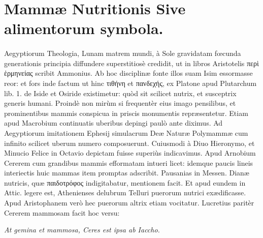 \documentclass[a4paper, 11pt, oneside, polutonikogreek, latin]{article}
\begin{document}
\section{Mammæ Nutritionis Sive alimentorum symbola.}
\paragraph{}
Aegyptiorum Theologia, Lunam matrem mundi, à Sole gravidatam fœcunda generationis principia diffundere superstitiosè credidit, ut in libros Aristotelis περὶ ἑρμηνείας scribit Ammonius. Ab hoc disciplinæ fonte illos suam Isim essormasse reor: et fors inde factum ut hinc 	τιθήνη et πανδεχής, ex Platone apud Plutarchum lib. 1. de Iside et Osiride existimetur: quòd sit scilicet nutrix, et susceptrix generis humani. Proindè non mirùm si frequentèr eius imago pensilibus, et prominentibus mammis conspicua in priscis monumentis repræsentetur. Etiam apud Macrobium continuatis uberibus depingi paulò ante diximus. Ad Aegyptiorum imitationem Ephesij simulacrum Deæ Naturæ Polymammæ cum infinito scilicet uberum numero composuerunt. Cuiusmodi à Diuo Hieronymo, et Minucio Felice in Octavio depictam fuisse superiùs indicavimus. Apud Arnobium Cererem cum grandibus mammis efformatam intueri licet: idemque paucis lineis interiectis huic mammas item promptas adscribit. Pausanias in Messen. Dianæ nutricis, quæ παιδοτρόφος indigitabatur, mentionem facit. Et apud eundem in Attic. legere est, Athenienses delubrum Telluri puerorum nutrici exædificasse. Apud Aristophanem verò hec puerorum altrix etiam vocitatur. Lucretius paritèr Cererem mammosam facit hoc versu:

\emph{At gemina et mammosa, Ceres est ipsa ab Iaccho.}
\end{document}
